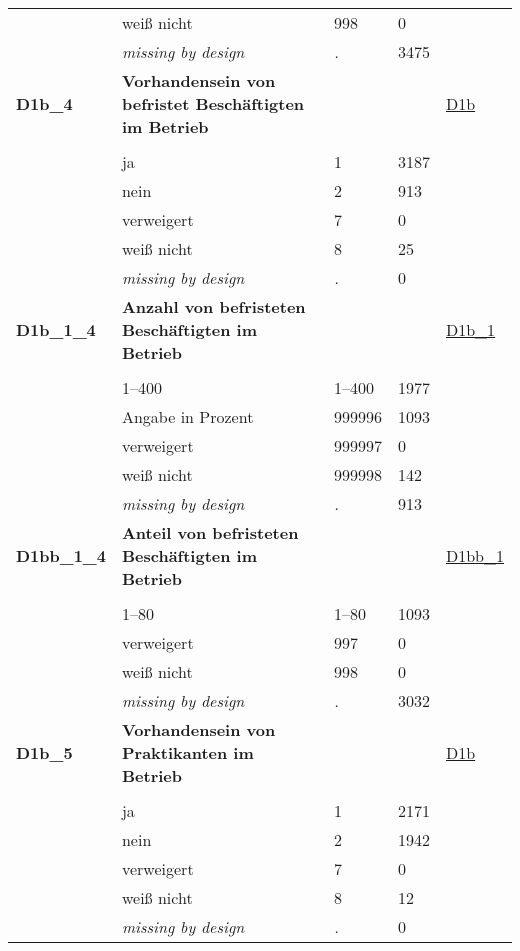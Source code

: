 \begin{longtable}{| L{2.65cm} | L{8cm} | C{1.5cm} | R{1.25cm} | C{2.25cm}  |}
   & weiß nicht & 998 & 0 &  \\ 
   & \textit{missing by design} & \textit{.} & 3475 &  \\ 
   \midrule
\textbf{D1b\_4}\label{var:D1b:4} & \textbf{Vorhandensein von befristet Beschäftigten im Betrieb} &  &  & \hyperref[D1b]{D1b} \\ 
   &  &  &  &  \\ 
   & ja & 1 & 3187 &  \\ 
   & nein & 2 & 913 &  \\ 
   & verweigert & 7 & 0 &  \\ 
   & weiß nicht & 8 & 25 &  \\ 
   & \textit{missing by design} & \textit{.} & 0 &  \\ 
   \midrule
\textbf{D1b\_1\_4}\label{var:D1b:1:4} & \textbf{Anzahl von befristeten Beschäftigten im Betrieb} &  &  & \hyperref[D1b:1]{D1b\_1} \\ 
   &  &  &  &  \\ 
   & 1--400 & 1--400 & 1977 &  \\ 
   & Angabe in Prozent & 999996 & 1093 &  \\ 
   & verweigert & 999997 & 0 &  \\ 
   & weiß nicht & 999998 & 142 &  \\ 
   & \textit{missing by design} & \textit{.} & 913 &  \\ 
   \midrule
\textbf{D1bb\_1\_4}\label{var:D1bb:1:4} & \textbf{Anteil von befristeten Beschäftigten im Betrieb} &  &  & \hyperref[D1bb:1]{D1bb\_1} \\ 
   &  &  &  &  \\ 
   & 1--80 & 1--80 & 1093 &  \\ 
   & verweigert & 997 & 0 &  \\ 
   & weiß nicht & 998 & 0 &  \\ 
   & \textit{missing by design} & \textit{.} & 3032 &  \\ 
   \midrule
\textbf{D1b\_5}\label{var:D1b:5} & \textbf{Vorhandensein von Praktikanten im Betrieb} &  &  & \hyperref[D1b]{D1b} \\ 
   &  &  &  &  \\ 
   & ja & 1 & 2171 &  \\ 
   & nein & 2 & 1942 &  \\ 
   & verweigert & 7 & 0 &  \\ 
   & weiß nicht & 8 & 12 &  \\ 
   & \textit{missing by design} & \textit{.} & 0 &  \\ 

\end{longtable}
